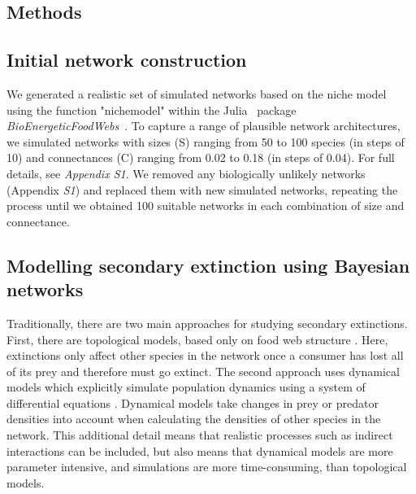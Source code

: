 \documentclass[12pt]{article}
\begin{document}
\begin{spacing}{2.0}
\section*{Methods}

	\subsection*{Initial network construction}

		We generated a realistic set of simulated networks based on the niche model~\citep{Williams2000,Stouffer2007} using the function "nichemodel" within the Julia~\citep{Bezanson2017julia} package \emph{BioEnergeticFoodWebs}~\citep{bioenergfw}. 
		To capture a range of plausible network architectures, we simulated networks with sizes (S) ranging from 50 to 100 species (in steps of 10) and connectances (C) ranging from 0.02 to 0.18 (in steps of 0.04). 
		For full details, see \emph{Appendix S1}.
		We removed any biologically unlikely networks (Appendix \emph{S1}) and replaced them with new simulated networks, repeating the process until we obtained 100 suitable networks in each combination of size and connectance.


    \subsection*{Modelling secondary extinction using Bayesian networks}

        Traditionally, there are two main approaches for studying secondary extinctions. First, there are topological models, based only on food web structure \citep{dunne2009cascading}. Here, extinctions only affect other species in the network once a consumer has lost all of its prey and therefore must go extinct. 
        The second approach uses dynamical models which explicitly simulate population dynamics using a system of differential equations \citep{binzer2011susceptibility}. Dynamical models take changes in prey or predator densities into account when calculating the densities of other species in the network. 
        This additional detail means that realistic processes such as indirect interactions can be included, but also means that dynamical models are more parameter intensive, and simulations are more time-consuming, than topological models. 
        

\end{spacing}
\end{document}
